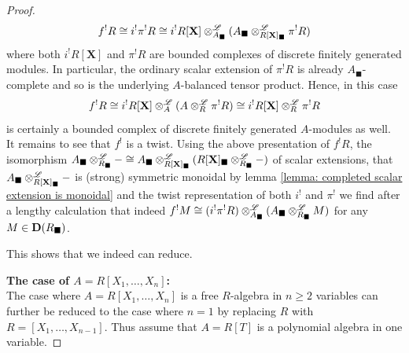 \begin{proof}
		$$f^!R \cong i^!\pi^! R \cong i^!R[\mathbf{X}] \otimes^{\mathscr{L}}_{A_\blacksquare} (A_\blacksquare \otimes^{\mathscr{L}}_{R[\mathbf{X}]_\blacksquare} \pi^!R)$$
	where both $i^!R[\mathbf{X}]$ and $\pi^!R$ are bounded complexes of discrete finitely generated modules. In particular, the ordinary scalar extension of $\pi^! R$ is already $A_\blacksquare$-complete and so is the underlying $A$-balanced tensor product. Hence, in this case
		$$f^!R\cong i^!R[\mathbf{X}]\otimes^{\mathscr{L}}_A(A\otimes^{\mathscr{L}}_R \pi^!R)\cong i^!R[\mathbf{X}]\otimes^{\mathscr{L}}_R \pi^!R$$
	is certainly a bounded complex of discrete finitely generated $A$-modules as well. It remains to see that $f^!$ is a twist.	Using the above presentation of $f^!R$, the isomorphism $A_\blacksquare\otimes^{\mathscr{L}}_{R_\blacksquare} - \cong A_\blacksquare \otimes^{\mathscr{L}}_{R[\mathbf{X}]_\blacksquare}(R[\mathbf{X}]_\blacksquare\otimes^{\mathscr{L}}_{R_\blacksquare} -) $ of scalar extensions, that $A_\blacksquare\otimes^{\mathscr{L}}_{R[\mathbf{X}]_\blacksquare} -$ is (strong) symmetric monoidal by lemma \ref{lemma: completed scalar extension is monoidal} and the twist representation of both $i^!$ and $\pi^!$ we find after a lengthy calculation that indeed $f^! M \cong (i^!\pi^!R)\otimes^{\mathscr{L}}_{A_\blacksquare} (A_\blacksquare\otimes^{\mathscr{L}}_{R_\blacksquare} M)$ for any $M\in{{\mathbf{D}}(R_\blacksquare)}$. 
	
	This shows that we indeed can reduce.
	
	\textbf{The case of $A=R[X_1, \dots, X_n]$:}\\
	The case where $A=R[X_1,\dots, X_n]$ is a free $R$-algebra in $n\ge 2$ variables can further be reduced to the case where $n=1$ by replacing $R$ with $R=[X_1,\dots,X_{n-1}]$. Thus assume that $A=R[T]$ is a polynomial algebra in one variable.
	

\end{proof}
